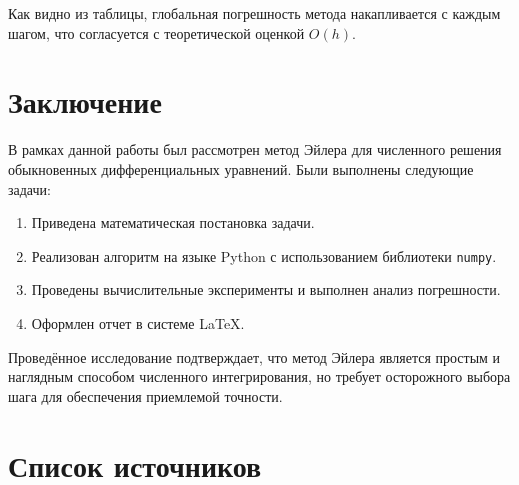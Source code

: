 \documentclass[a4paper,12pt]{SCWorks}
\begin{document}
Как видно из таблицы, глобальная погрешность метода накапливается с каждым шагом, что согласуется с теоретической оценкой \(O(h)\).

\section{Заключение}
\label{sec:conclusion}

В рамках данной работы был рассмотрен метод Эйлера для численного решения обыкновенных дифференциальных уравнений. Были выполнены следующие задачи:
\begin{enumerate}
    \item Приведена математическая постановка задачи.
    \item Реализован алгоритм на языке Python с использованием библиотеки \texttt{numpy}.
    \item Проведены вычислительные эксперименты и выполнен анализ погрешности.
    \item Оформлен отчет в системе \LaTeX.
\end{enumerate}
Проведённое исследование подтверждает, что метод Эйлера является простым и наглядным способом численного интегрирования, но требует осторожного выбора шага для обеспечения приемлемой точности.

\section*{Список источников}
\printbibliography[heading=none]
\end{document}
